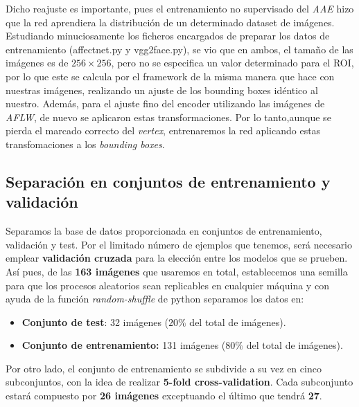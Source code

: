             

            \medskip

            \noindent Dicho reajuste es importante, pues el entrenamiento no supervisado del \textit{AAE} hizo que la red aprendiera la distribución de un determinado dataset de imágenes. Estudiando minuciosamente los ficheros encargados de preparar los datos de entrenamiento (affectnet.py y vgg2face.py), se vio que en ambos, el tamaño de las imágenes es de $256 \times 256$, pero no se especifica un valor determinado para el ROI, por lo que este se calcula por el framework de la misma manera que hace con nuestras imágenes, realizando un ajuste de los bounding boxes idéntico al nuestro. Además, para el ajuste fino del encoder utilizando las imágenes de \textit{AFLW}, de nuevo se aplicaron estas transformaciones. Por lo tanto,aunque se pierda el marcado correcto del \textit{vertex}, entrenaremos la red aplicando estas transfomaciones a los \textit{bounding boxes}.

    \subsection{Separación en conjuntos de entrenamiento y validación}
        \noindent Separamos la base de datos proporcionada en conjuntos de entrenamiento, validación y test. Por el limitado número de ejemplos que tenemos, será necesario emplear \textbf{validación cruzada} para la elección entre los modelos que se prueben. Así pues, de las \textbf{163 imágenes} que usaremos en total, establecemos una semilla para que los procesos aleatorios sean replicables en cualquier máquina y con ayuda de la función \textit{random-shuffle} de python separamos los datos en: 

        \begin{itemize}
            \item \textbf{Conjunto de test}: 32 imágenes ($20\%$ del total de imágenes).
            \item \textbf{Conjunto de entrenamiento:} 131 imágenes ($80\%$ del total de imágenes).
        \end{itemize}

        \noindent Por otro lado, el conjunto de entrenamiento se subdivide a su vez en cinco subconjuntos, con la idea de realizar \textbf{5-fold cross-validation}. Cada subconjunto estará compuesto por \textbf{26 imágenes} exceptuando el último que tendrá \textbf{27}.
        
        \medskip

